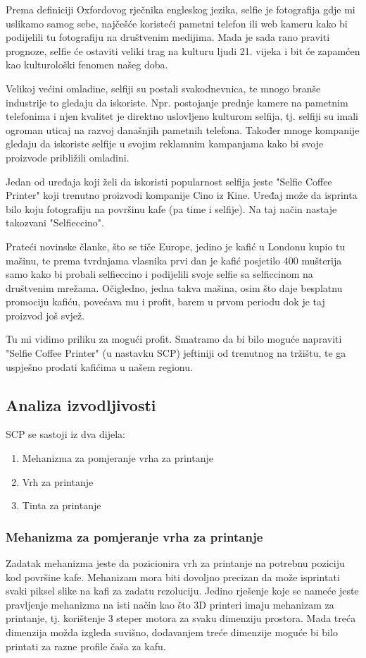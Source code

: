\documentclass[12pt]{article}
\begin{document}
Prema definiciji Oxfordovog rječnika engleskog jezika, selfie je fotografija gdje mi uslikamo samog sebe, najčešće koristeći pametni telefon ili web kameru kako bi podijelili tu fotografiju na društvenim medijima. Mada je sada rano praviti prognoze, selfie će ostaviti veliki trag na kulturu ljudi 21. vijeka i bit će zapamćen kao kulturološki fenomen našeg doba. 

Velikoj većini omladine, selfiji su postali svakodnevnica, te mnogo branše industrije to gledaju da iskoriste. Npr. postojanje prednje kamere na pametnim telefonima i njen kvalitet je direktno uslovljeno kulturom selfija, tj. selfiji su imali ogroman uticaj na razvoj današnjih pametnih telefona. Također mnoge kompanije gledaju da iskoriste selfije u svojim reklamnim kampanjama kako bi svoje proizvode približili omladini. 

Jedan od uređaja koji želi da iskoristi popularnost selfija jeste "Selfie Coffee Printer" koji trenutno proizvodi kompanije Cino iz Kine. Uređaj može da isprinta bilo koju fotografiju na površinu kafe (pa time i selfije). Na taj način nastaje takozvani "Selfieccino". 

Prateći novinske članke, što se tiče Europe, jedino je kafić u Londonu kupio tu mašinu, te prema tvrdnjama vlasnika prvi dan je kafić posjetilo 400 mušterija samo kako bi probali selfieccino i podijelili svoje selfie sa selficcinom na društvenim mre\v{z}ama. Očigledno, jedna takva mašina, osim što daje besplatnu promociju kafiću, povećava mu i profit, barem u prvom periodu dok je taj proizvod još svjež.

Tu mi vidimo priliku za mogući profit. Smatramo da bi bilo moguće napraviti "Selfie Coffee Printer" (u nastavku SCP) jeftiniji od trenutnog na tržištu, te ga uspješno prodati kafićima u našem regionu.

\subsection{Analiza izvodljivosti}
SCP se sastoji iz dva dijela:
\begin{enumerate}
\item Mehanizma za pomjeranje vrha za printanje
\item Vrh za printanje
\item Tinta za printanje
\end{enumerate}

\newpage

\subsubsection{Mehanizma za pomjeranje vrha za printanje}
Zadatak mehanizma jeste da pozicionira vrh za printanje na potrebnu poziciju kod površine kafe. Mehanizam mora biti dovoljno precizan da može isprintati svaki piksel slike na kafi za zadatu rezoluciju. Jedino rješenje koje se nameće jeste pravljenje mehanizma na isti način kao što 3D printeri imaju mehanizam za printanje, tj. korištenje 3 steper motora za svaku dimenziju prostora. Mada treća dimenzija možda izgleda suvišno, dodavanjem treće dimenzije moguće bi bilo printati za razne profile čaša za kafu.
\end{document}
